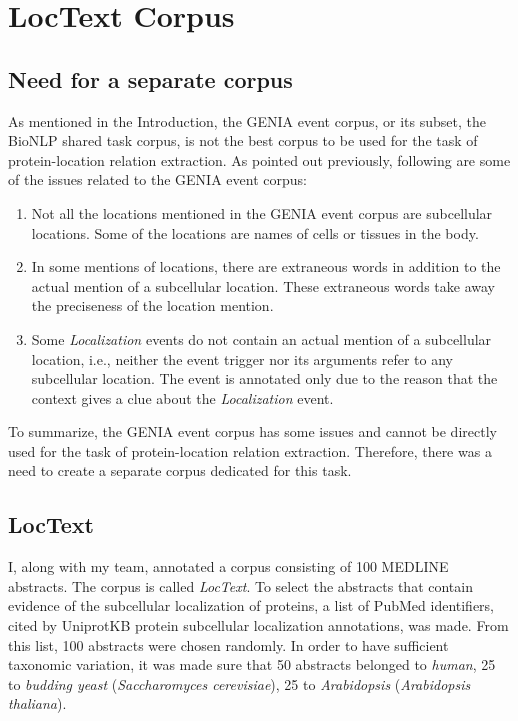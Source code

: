 \chapter{LocText Corpus}\label{chapter:corpus}

\section{Need for a separate corpus}

As mentioned in the Introduction, the GENIA event corpus, or its subset, the BioNLP shared task corpus, is not the best corpus to be used for the task of protein-location relation extraction. As pointed out previously, following are some of the issues related to the GENIA event corpus:

\begin{enumerate}

\item Not all the locations mentioned in the GENIA event corpus are subcellular locations. Some of the locations are names of cells or tissues in the body.

\item In some mentions of locations, there are extraneous words in addition to the actual mention of a subcellular location. These extraneous words take away the preciseness of the location mention. %

\item Some \textit{Localization} events do not contain an actual mention of a subcellular location, i.e., neither the event trigger nor its arguments refer to any subcellular location. The event is annotated only due to the reason that the context gives a clue about the \textit{Localization} event.

\end{enumerate}

To summarize, the GENIA event corpus has some issues and cannot be directly used for the task of protein-location relation extraction. Therefore, there was a need to create a separate corpus dedicated for this task.

\section{LocText}


I, along with my team, annotated a corpus consisting of 100 MEDLINE \cite{medline} abstracts. The corpus is called \emph{LocText}. To select the abstracts that contain evidence of the subcellular localization of proteins, a list of PubMed \cite{pubmed} identifiers, cited by UniprotKB \cite{magrane2011uniprot} protein subcellular localization annotations, was made. %
From this list, 100 abstracts were chosen randomly. In order to have sufficient taxonomic variation, it was made sure that 50 abstracts belonged to \emph{human}, 25 to \emph{budding yeast} (\emph{Saccharomyces cerevisiae}), 25 to \emph{Arabidopsis} (\emph{Arabidopsis thaliana}).

